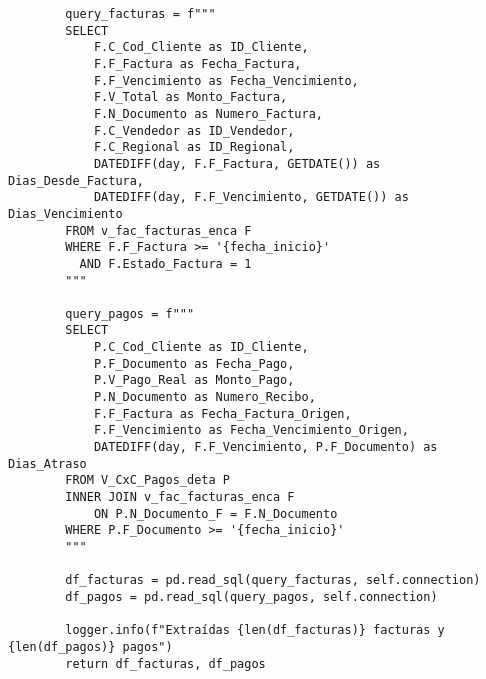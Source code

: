 \begin{verbatim}
        query_facturas = f"""
        SELECT 
            F.C_Cod_Cliente as ID_Cliente,
            F.F_Factura as Fecha_Factura,
            F.F_Vencimiento as Fecha_Vencimiento,
            F.V_Total as Monto_Factura,
            F.N_Documento as Numero_Factura,
            F.C_Vendedor as ID_Vendedor,
            F.C_Regional as ID_Regional,
            DATEDIFF(day, F.F_Factura, GETDATE()) as Dias_Desde_Factura,
            DATEDIFF(day, F.F_Vencimiento, GETDATE()) as Dias_Vencimiento
        FROM v_fac_facturas_enca F
        WHERE F.F_Factura >= '{fecha_inicio}'
          AND F.Estado_Factura = 1
        """
        
        query_pagos = f"""
        SELECT 
            P.C_Cod_Cliente as ID_Cliente,
            P.F_Documento as Fecha_Pago,
            P.V_Pago_Real as Monto_Pago,
            P.N_Documento as Numero_Recibo,
            F.F_Factura as Fecha_Factura_Origen,
            F.F_Vencimiento as Fecha_Vencimiento_Origen,
            DATEDIFF(day, F.F_Vencimiento, P.F_Documento) as Dias_Atraso
        FROM V_CxC_Pagos_deta P
        INNER JOIN v_fac_facturas_enca F 
            ON P.N_Documento_F = F.N_Documento
        WHERE P.F_Documento >= '{fecha_inicio}'
        """
        
        df_facturas = pd.read_sql(query_facturas, self.connection)
        df_pagos = pd.read_sql(query_pagos, self.connection)
        
        logger.info(f"Extraídas {len(df_facturas)} facturas y {len(df_pagos)} pagos")
        return df_facturas, df_pagos
\end{verbatim}
